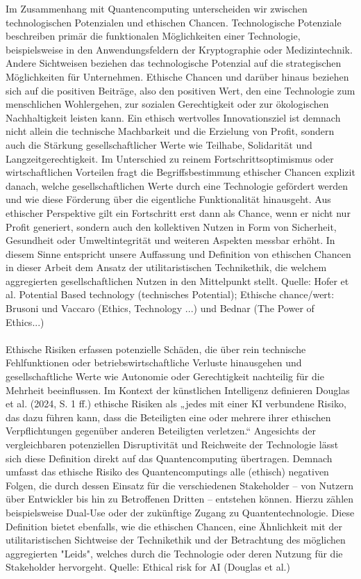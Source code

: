 Im Zusammenhang mit Quantencomputing unterscheiden wir zwischen technologischen Potenzialen und ethischen Chancen. Technologische Potenziale beschreiben primär die funktionalen Möglichkeiten einer Technologie, beispielsweise in den Anwendungsfeldern der Kryptographie oder Medizintechnik. Andere Sichtweisen beziehen das technologische Potenzial auf die strategischen Möglichkeiten für Unternehmen. Ethische Chancen und darüber hinaus beziehen sich auf die positiven Beiträge, also den positiven Wert, den eine Technologie zum menschlichen Wohlergehen, zur sozialen Gerechtigkeit oder zur ökologischen Nachhaltigkeit leisten kann. Ein ethisch wertvolles Innovationsziel ist demnach nicht allein die technische Machbarkeit und die Erzielung von Profit, sondern auch die Stärkung gesellschaftlicher Werte wie Teilhabe, Solidarität und Langzeitgerechtigkeit. Im Unterschied zu reinem Fortschrittsoptimismus oder wirtschaftlichen Vorteilen fragt die Begriffsbestimmung ethischer Chancen explizit danach, welche gesellschaftlichen Werte durch eine Technologie gefördert werden und wie diese Förderung über die eigentliche Funktionalität hinausgeht. Aus ethischer Perspektive gilt ein Fortschritt erst dann als Chance, wenn er nicht nur Profit generiert, sondern auch den kollektiven Nutzen in Form von Sicherheit, Gesundheit oder Umweltintegrität und weiteren Aspekten messbar erhöht. In diesem Sinne entspricht unsere Auffassung und Definition von ethischen Chancen in dieser Arbeit dem Ansatz der utilitaristischen Technikethik, die welchem aggregierten gesellschaftlichen Nutzen in den Mittelpunkt stellt. \cite{} Quelle: Hofer et al. Potential Based technology (technisches Potential); Ethische chance/wert: Brusoni und Vaccaro (Ethics, Technology ...) und Bednar (The Power of Ethics...)
\\
\\
Ethische Risiken erfassen potenzielle Schäden, die über rein technische Fehlfunktionen oder betriebswirtschaftliche Verluste hinausgehen und gesellschaftliche Werte wie Autonomie oder Gerechtigkeit nachteilig für die Mehrheit beeinflussen. Im Kontext der künstlichen Intelligenz definieren Douglas et al. (2024, S. 1 ff.) ethische Risiken als „jedes mit einer KI verbundene Risiko, das dazu führen kann, dass die Beteiligten eine oder mehrere ihrer ethischen Verpflichtungen gegenüber anderen Beteiligten verletzen.“ Angesichts der vergleichbaren potenziellen Disruptivität und Reichweite der Technologie lässt sich diese Definition direkt auf das Quantencomputing übertragen. Demnach umfasst das ethische Risiko des Quantencomputings alle (ethisch) negativen Folgen, die durch dessen Einsatz für die verschiedenen Stakeholder – von Nutzern über Entwickler bis hin zu Betroffenen Dritten – entstehen können. Hierzu zählen beispielsweise Dual-Use oder der zukünftige Zugang zu Quantentechnologie. Diese Definition bietet ebenfalls, wie die ethischen Chancen, eine Ähnlichkeit mit der utilitaristischen Sichtweise der Technikethik und der Betrachtung des möglichen aggregierten "Leids", welches durch die Technologie oder deren Nutzung für die Stakeholder hervorgeht. \cite{} Quelle: Ethical risk for AI (Douglas et al.)
